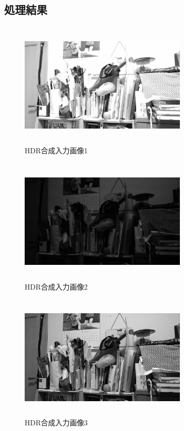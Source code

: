 \documentclass[11pt,a4j]{jsarticle}
\begin{document}
    \subsection{処理結果}
    \begin{figure}[H]
      \centering
      \includegraphics[clip,width=8.0cm ,height= 6.0cm]{./img/hdr/hdr1.png}
      \caption{HDR合成入力画像1\label{fig:hdr1_source}}
    \end{figure}
    \begin{figure}[H]
      \centering
      \includegraphics[clip,width=8.0cm ,height= 6.0cm]{./img/hdr/hdr2.png}
      \caption{HDR合成入力画像2\label{fig:hdr2_result}}
    \end{figure}
    \begin{figure}[H]
      \centering
      \includegraphics[clip,width=8.0cm ,height= 6.0cm]{./img/hdr/hdr3.png}
      \caption{HDR合成入力画像3\label{fig:hdr3_source}}
    \end{figure}
\end{document}
